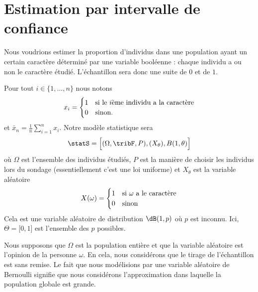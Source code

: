 \section{Estimation par intervalle de confiance}

Nous voudrions estimer la proportion d'individus dans une population ayant un certain caractère déterminé par une variable booléenne : chaque individu a ou non le caractère étudié. L'échantillon sera donc une suite de \( 0\) et de \( 1\).

Pour tout \( i\in\{ 1,\ldots, n \}\) nous notons
\begin{equation}
    x_i=\begin{cases}
        1    &   \text{si le \( i\)ème individu a la caractère}\\
        0    &    \text{sinon}.
    \end{cases}
\end{equation}
et \( \bar x_n=\frac{1}{ n }\sum_{i=1}^n x_i\). Notre modèle statistique sera
\begin{equation}
    \statS=\Big[ (\Omega,\tribF,P),(X_{\theta}),B(1,\theta) \Big]
\end{equation}
où \( \Omega\) est l'ensemble des individus étudiés, \( P\) est la manière de choisir les individus lors du sondage (essentiellement c'est une loi uniforme) et \( X_{\theta}\) est la variable aléatoire
\begin{equation}
    X(\omega)=\begin{cases}
        1    &   \text{si \( \omega\) a le caractère}\\
        0    &    \text{sinon}
    \end{cases}
\end{equation}
Cela est une variable aléatoire de distribution \( \dB(1,p)\) où \( p\) est inconnu. Ici, \( \Theta=\mathopen[ 0 , 1 \mathclose]\) est l'ensemble des \( p\) possibles.

\begin{remark}
    Nous supposons que \( \Omega\) est la population entière et que la variable aléatoire est l'opinion de la personne \( \omega\). En cela, nous considérons que le tirage de l'échantillon est sans remise. Le fait que nous modélisions par une variable aléatoire de Bernoulli signifie que nous considérons l'approximation dans laquelle la population globale est grande.
\end{remark}

